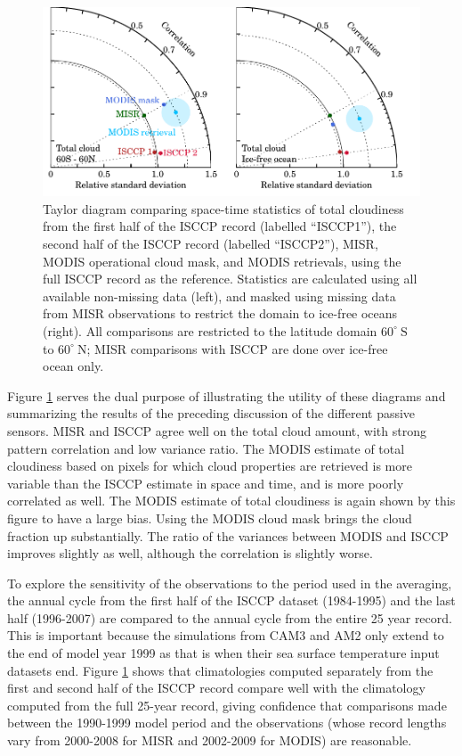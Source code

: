 \begin{figure}
    \centering
    \includegraphics{../graphics/clt_retrievals_taylor.pdf} 
    \caption[Taylor diagram comparing space-time statistics of total cloudiness from ISCCP, MISR, and MODIS retrievals.]{Taylor diagram comparing space-time statistics of total cloudiness from the first half of the ISCCP record (labelled ``ISCCP1''), the second half of the ISCCP record (labelled ``ISCCP2''), MISR, MODIS operational cloud mask, and MODIS retrievals, using the full ISCCP record as the reference. Statistics are calculated using all available non-missing data (left), and masked using missing data from MISR observations to restrict the domain to ice-free oceans (right). All comparisons are restricted to the latitude domain $60^\circ~\text{S}$ to $60^\circ~\text{N}$; MISR comparisons with ISCCP are done over ice-free ocean only.}
    \label{cldtot_obs_taylor}
\end{figure}

Figure \ref{cldtot_obs_taylor} serves the dual purpose of illustrating the utility of these diagrams and summarizing the results of the preceding discussion of the different passive sensors. MISR and ISCCP agree well on the total cloud amount, with strong pattern correlation and low variance ratio. The MODIS estimate of total cloudiness based on pixels for which cloud properties are retrieved is more variable than the ISCCP estimate in space and time, and is more poorly correlated as well. The MODIS estimate of total cloudiness is again shown by this figure to have a large bias. Using the MODIS cloud mask brings the cloud fraction up substantially. The ratio of the variances between MODIS and ISCCP improves slightly as well, although the correlation is slightly worse.

To explore the sensitivity of the observations to the period used in the averaging, the annual cycle from the first half of the ISCCP dataset (1984-1995) and the last half (1996-2007) are compared to the annual cycle from the entire 25 year record. This is important because the simulations from CAM3 and AM2 only extend to the end of model year 1999 as that is when their sea surface temperature input datasets end. Figure \ref{cldtot_obs_taylor} shows that climatologies computed separately from the first and second half of the ISCCP record compare well with the climatology computed from the full 25-year record, giving confidence that comparisons made between the 1990-1999 model period and the observations (whose record lengths vary from 2000-2008 for MISR and 2002-2009 for MODIS) are reasonable.

